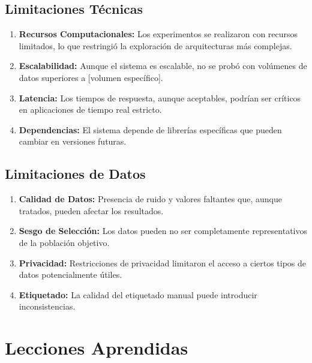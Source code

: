 \subsection{Limitaciones Técnicas}

\begin{enumerate}
    \item \textbf{Recursos Computacionales:} Los experimentos se realizaron con recursos limitados, lo que restringió la exploración de arquitecturas más complejas.
    
    \item \textbf{Escalabilidad:} Aunque el sistema es escalable, no se probó con volúmenes de datos superiores a [volumen específico].
    
    \item \textbf{Latencia:} Los tiempos de respuesta, aunque aceptables, podrían ser críticos en aplicaciones de tiempo real estricto.
    
    \item \textbf{Dependencias:} El sistema depende de librerías específicas que pueden cambiar en versiones futuras.
\end{enumerate}

\subsection{Limitaciones de Datos}

\begin{enumerate}
    \item \textbf{Calidad de Datos:} Presencia de ruido y valores faltantes que, aunque tratados, pueden afectar los resultados.
    
    \item \textbf{Sesgo de Selección:} Los datos pueden no ser completamente representativos de la población objetivo.
    
    \item \textbf{Privacidad:} Restricciones de privacidad limitaron el acceso a ciertos tipos de datos potencialmente útiles.
    
    \item \textbf{Etiquetado:} La calidad del etiquetado manual puede introducir inconsistencias.
\end{enumerate}

\section{Lecciones Aprendidas}

